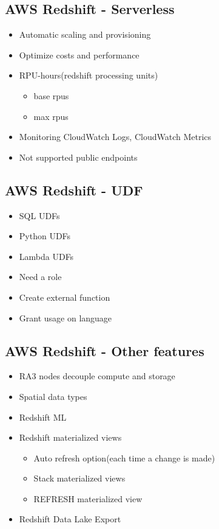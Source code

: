 \documentclass[../../main.tex]{subfiles}
\begin{document}
\subsection{AWS Redshift - Serverless}
\begin{itemize}
    \item Automatic scaling and provisioning
    \item Optimize costs and performance
    \item RPU-hours(redshift processing units)
    \begin{itemize}
        \item base rpus
        \item max rpus
    \end{itemize}
    \item Monitoring CloudWatch Logs, CloudWatch Metrics
    \item Not supported public endpoints
\end{itemize}

\subsection{AWS Redshift - UDF}
\begin{itemize}
    \item SQL UDFs
    \item Python UDFs
    \item Lambda UDFs
    \item Need a role
    \item Create external function
    \item Grant usage on language
\end{itemize}

\subsection{AWS Redshift - Other features}
\begin{itemize}
    \item RA3 nodes decouple compute and storage
    \item Spatial data types
    \item Redshift ML
    \item Redshift materialized views
    \begin{itemize}
        \item Auto refresh option(each time a change is made)
        \item Stack materialized views
        \item REFRESH materialized view
    \end{itemize}
    \item Redshift Data Lake Export
\end{itemize}
\end{document}
